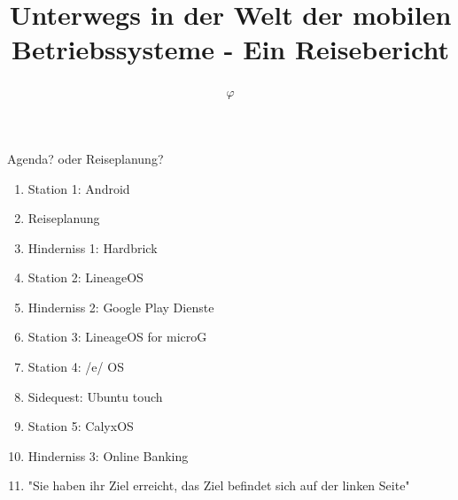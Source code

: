 \documentclass[14pt,compress,usenames,dvipsnames,aspectratio=169]{beamer}
\title{\textbf{Unterwegs in der Welt der mobilen Betriebssysteme - Ein Reisebericht}}
\author{\textbf{$\varphi$}}
\date{}
\begin{document}

\begin{frame}[plain]
\titlepage
{}
\end{frame}

\begin{frame}{Agenda? oder Reiseplanung?}
    \begin{enumerate}
        \item Station 1: Android
        \item Reiseplanung 
        \item Hinderniss 1: Hardbrick
        \item Station 2: LineageOS
        \item Hinderniss 2: Google Play Dienste
        \item Station 3: LineageOS for microG
        \item Station 4: /e/ OS 
        \item Sidequest: Ubuntu touch 
        \item Station 5: CalyxOS 
        \item Hinderniss 3: Online Banking
        \item "Sie haben ihr Ziel erreicht, das Ziel befindet sich auf der linken Seite"
    \end{enumerate}


\end{frame}
\end{document}
